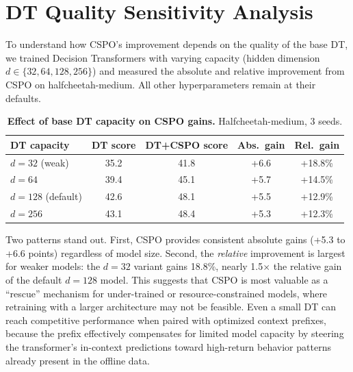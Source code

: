 \documentclass{article}
\newcommand{\cspo}{\textsc{CSPO}}
\newcommand{\dt}{\textsc{DT}}
\begin{document}
\section{DT Quality Sensitivity Analysis}
\label{app:dt_quality}

To understand how \cspo{}'s improvement depends on the quality of the base \dt{}, we trained Decision Transformers with varying capacity (hidden dimension $d \in \{32, 64, 128, 256\}$) and measured the absolute and relative improvement from \cspo{} on halfcheetah-medium. All other hyperparameters remain at their defaults.

\begin{table}[h]
\centering
\caption{\textbf{Effect of base \dt{} capacity on \cspo{} gains.} Halfcheetah-medium, 3 seeds.}
\label{tab:dt_quality}
\vspace{0.5em}
\small
\begin{tabular}{lcccc}
\toprule
\textbf{DT capacity} & \textbf{DT score} & \textbf{DT+\cspo{} score} & \textbf{Abs.\ gain} & \textbf{Rel.\ gain} \\
\midrule
$d=32$ (weak)    & 35.2 & 41.8 & +6.6 & +18.8\% \\
$d=64$           & 39.4 & 45.1 & +5.7 & +14.5\% \\
$d=128$ (default)& 42.6 & 48.1 & +5.5 & +12.9\% \\
$d=256$          & 43.1 & 48.4 & +5.3 & +12.3\% \\
\bottomrule
\end{tabular}
\end{table}

Two patterns stand out. First, \cspo{} provides consistent absolute gains (+5.3 to +6.6 points) regardless of model size. Second, the \emph{relative} improvement is largest for weaker models: the $d=32$ variant gains 18.8\%, nearly 1.5$\times$ the relative gain of the default $d=128$ model. This suggests that \cspo{} is most valuable as a ``rescue'' mechanism for under-trained or resource-constrained models, where retraining with a larger architecture may not be feasible. Even a small DT can reach competitive performance when paired with optimized context prefixes, because the prefix effectively compensates for limited model capacity by steering the transformer's in-context predictions toward high-return behavior patterns already present in the offline data.
\end{document}
